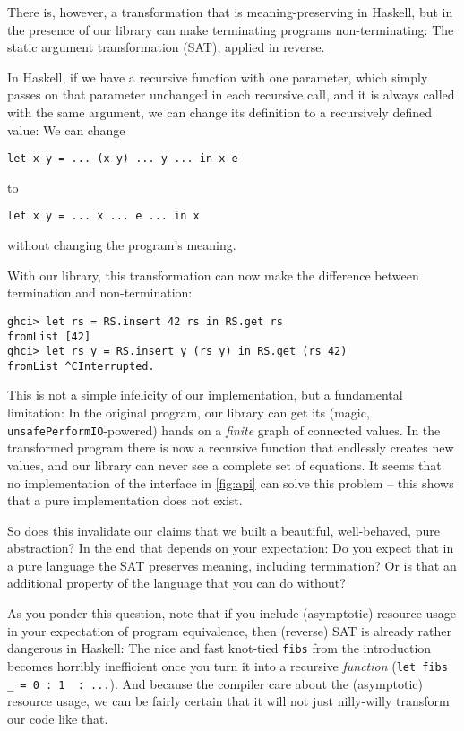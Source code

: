 \documentclass[manuscript,screen,acmsmall]{acmart}
\begin{document}
There is, however, a transformation that is meaning-preserving in Haskell, but in the presence of our library can make terminating programs non-terminating:
The static argument transformation (SAT), applied in reverse.

In Haskell, if we have a recursive function with one parameter, which simply passes on that parameter unchanged in each recursive call, and it is always called with the same argument, we can change its definition to a recursively defined value: We can change
\begin{verbatim}
let x y = ... (x y) ... y ... in x e
\end{verbatim}
to
\begin{verbatim}
let x y = ... x ... e ... in x
\end{verbatim}
without changing the program's meaning.

With our library, this transformation can now make the difference between termination and non-termination:
\begin{verbatim}
ghci> let rs = RS.insert 42 rs in RS.get rs
fromList [42]
ghci> let rs y = RS.insert y (rs y) in RS.get (rs 42)
fromList ^CInterrupted.
\end{verbatim}

This is not a simple infelicity of our implementation, but a fundamental limitation: In the original program, our library can get its (magic, \verb|unsafePerformIO|-powered) hands on a \emph{finite} graph of connected values. In the transformed program there is now a recursive function that endlessly creates new values, and our library can never see a complete set of equations. It seems that no implementation of the interface in \cref{fig:api} can solve this problem -- this shows that a pure implementation does not exist.

So does this invalidate our claims that we built a beautiful, well-behaved, pure abstraction? In the end that depends on your expectation: Do you expect that in a pure language the SAT preserves meaning, including termination? Or is that an additional property of the language that you can do without?

As you ponder this question, note that if you include (asymptotic) resource usage in your expectation of program equivalence, then (reverse) SAT is already rather dangerous in Haskell: The nice and fast knot-tied \verb|fibs| from the introduction becomes horribly inefficient once you turn it into a recursive \emph{function} (\verb|let fibs _ = 0 : 1  : ...|). And because the compiler care about the (asymptotic) resource usage, we can be fairly certain that it will not just nilly-willy transform our code like that.
\end{document}
